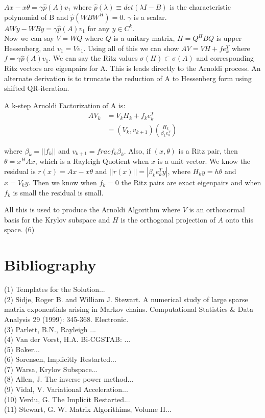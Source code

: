\documentclass[12pt,twoside]{book}
\begin{document}
\noindent $Ax - x\theta = \gamma \hat{p}(A)v_{1}$ where $\hat{p}(\lambda) \equiv det(\lambda I - B)$ is the characteristic polynomial of B and $\hat{p}(WBW^{H}) = 0$. $\gamma$ is a scalar.  \\
\noindent $AWy - WBy = \gamma\hat{p}(A)v_{1}$ for any $y \in C^{k}$. \\

Now we can say $V = WQ$ where $Q$ is a unitary matrix, $H = Q^{H}BQ$ is upper Hessenberg, and $v_{1} = Ve_{1}$. Using all of this we can show $AV = VH + f e^{T}_{k}$ where $f = \gamma\hat{p}(A)v_{1}$. We can say the Ritz values $\sigma(H) \subset \sigma(A)$ and corresponding Ritz vectors are eigenpairs for A. This is leads directly to the Arnoldi process. An alternate derivation is to truncate the reduction of A to Hessenberg form using shifted QR-iteration. 

A k-step Arnoldi Factorization of A is:
\begin{align*}
AV_{k} &= V_{k}H_{k} + f_{k}e^{T}_{k} \\ 
             &= (V_{k},v_{k+1})\binom{H_{k}}{\beta_{k}e_{k}^{T}} 
\end{align*}

\noindent where $\beta_{k} = ||f_{k}||$ and $v_{k+1} = frac{f_{k}}{\beta_{k}}$. Also, if $(x, \theta)$ is a Ritz pair, then $\theta = x^{H}Ax$, which is a Rayleigh Quotient when $x$ is a unit vector. We know the residual is $r(x) = Ax - x\theta$ and $||r(x)|| = |\beta_{k}e_{k}^{T}y|$, where $H_{k}y = h\theta$ and $x = V_{k}y$. Then we know when $f_{k} = 0$ the Ritz pairs are exact eigenpairs and when $f_{k}$ is small the residual is small.

All this is used to produce the Arnoldi Algorithm where $V$ is an orthonormal basis for the Krylov subspace and $H$ is the orthogonal projection of $A$ onto this space. (6)
 
 
\section{Bibliography}
(1) Templates for the Solution... \\
(2) Sidje, Roger B. and William J. Stewart. A numerical study of large sparse matrix exponentials arising in Markov chains. Computational Statistics \& Data Analysis 29 (1999): 345-368. Electronic. \\
(3) Parlett, B.N., Rayleigh ... \\
(4) Van der Vorst, H.A. Bi-CGSTAB: ...\\
(5) Baker... \\
(6) Sorensen, Implicitly Restarted...\\
(7) Warsa, Krylov Subspace...\\
(8) Allen, J. The inverse power method...\\
(9) Vidal, V. Variational Acceleration...\\
(10) Verdu, G. The Implicit Restarted...\\
(11) Stewart, G. W. Matrix Algorithims, Volume II... \\
\end{document}
